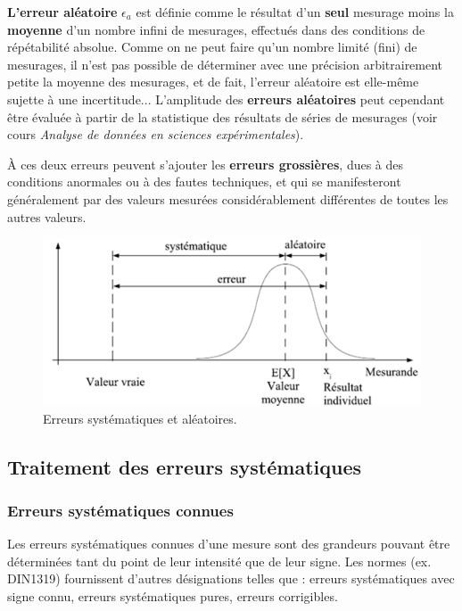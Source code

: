 \textbf{L'erreur aléatoire} $\epsilon_a$ est définie comme le résultat d'un \textbf{seul} mesurage moins la \textbf{moyenne} d'un nombre infini de mesurages, effectués dans des conditions de répétabilité absolue. Comme on ne peut faire qu'un nombre limité (fini) de mesurages, il n'est pas possible de déterminer avec une précision arbitrairement petite la moyenne des mesurages, et de fait, l'erreur aléatoire est elle-même sujette à une incertitude... L'amplitude des \textbf{erreurs aléatoires} peut cependant être évaluée à partir de la statistique des résultats de séries de mesurages (voir cours \textit{Analyse de données en sciences expérimentales}).

À ces deux erreurs peuvent s'ajouter les \textbf{erreurs grossières}, dues à des conditions anormales ou à des fautes techniques, et qui se manifesteront généralement par des valeurs mesurées considérablement différentes de toutes les autres valeurs.
\begin{figure}[t]
   \centering
   \includegraphics[width=14cm]{assets/figures/errsysale.pdf}
   \caption{Erreurs systématiques et aléatoires.}
   \label{fig:example}
\end{figure}

\subsection{Traitement des erreurs systématiques}

\subsubsection{Erreurs systématiques connues}

Les erreurs systématiques connues d'une mesure sont des grandeurs pouvant être déterminées tant du point de leur intensité que de leur signe. Les normes (ex. DIN1319) fournissent d'autres désignations telles que : erreurs systématiques avec signe connu, erreurs systématiques pures, erreurs corrigibles.

